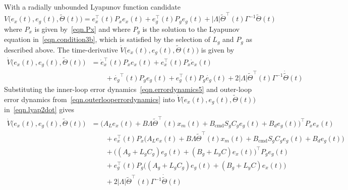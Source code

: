 \begin{proof-dan}
  With a radially unbounded Lyapunov function candidate
  \begin{equation}
    \label{eqn.lyapfunction_2}
    V\bigr(e_{x}(t), e_{g}(t), \widetilde{\Theta}(t)\bigr) = e_{x}^{\top}(t)P_{x}e_{x}(t)
    + e_{g}^{\top}(t)P_{g}e_{g}(t)
    + |\Lambda|\widetilde{\Theta}^{\top}(t)\Gamma^{-1}\widetilde{\Theta}(t)
  \end{equation}
  where $P_{x}$ is given by\ \eqref{eqn.Px} and where $P_{g}$ is the solution to the Lyapunov equation in\ \eqref{eqn.condition3b}, which is satisfied by the selection of $L_{g}$ and $P_{g}$ as described above.
  The time-derivative $\dot{V}\bigr(e_{x}(t), e_{g}(t), \widetilde{\Theta}(t)\bigr)$ is given by
  \begin{equation}
    \label{eqn.lyap2dot}
    \begin{split}
      \dot{V}\bigr(e_{x}(t), e_{g}(t), \widetilde{\Theta}(t)\bigr)
      &=
      \dot{e}_{x}^{\top}(t)P_{x}e_{x}(t)
      + e_{x}^{\top}(t)P_{x}\dot{e}_{x}(t) \\
      & \qquad
      + \dot{e_{g}}^{\top}(t)P_{g}e_{g}(t)
      + e_{g}^{\top}(t)P_{g}\dot{e_{g}}(t)
      + 2|\Lambda|\widetilde{\Theta}^{\top}(t)\Gamma^{-1}\dot{\widetilde{\Theta}}(t)
    \end{split}
  \end{equation}
  Substituting the inner-loop error dynamics\ \eqref{eqn.errordynamics5} and outer-loop error dynamics from\ \eqref{eqn.outerlooperrordynamics} into $\dot{V}\bigr(e_{x}(t), e_{g}(t), \widetilde{\Theta}(t)\bigr)$ in\ \eqref{eqn.lyap2dot} gives
  \begin{equation}
    \label{eqn.lyap2dot2}
    \begin{split}
      \dot{V}\bigr(e_{x}(t), e_{g}(t), \widetilde{\Theta}(t)\bigr)
      &=
      \bigr(A_{L}e_{x}(t)+B\Lambda\widetilde{\Theta}^{\top}(t)x_{m}(t) + B_{\text{cmd}}S_{g}C_{g}e_{g}(t) + B_{d}e_{g}(t)\bigr)^{\top}P_{x}e_{x}(t) \\
      & \qquad
      + e_{x}^{\top}(t)P_{x} \bigr(A_{L}e_{x}(t) + B\Lambda\widetilde{\Theta}^{\top}(t)x_{m}(t) + B_{\text{cmd}}S_{g}C_{g}e_{g}(t)  + B_{d}e_{g}(t) \bigr) \\
      & \qquad
      + \bigr((A_{g}+L_{g}C_{g})e_{g}(t) + (B_{g}+L_{y}C)e_{x}(t)\bigr)^{\top}P_{g}e_{g}(t) \\
      & \qquad
      + e_{g}^{\top}(t)P_{g}\bigr((A_{g}+L_{g}C_{g})e_{g}(t)+(B_{g}+L_{y}C)e_{x}(t)\bigr) \\
      & \qquad
      + 2|\Lambda|\widetilde{\Theta}^{\top}(t)\Gamma^{-1}\dot{\widetilde{\Theta}}(t) \\

\end{split}
\end{equation}
\end{proof-dan}
